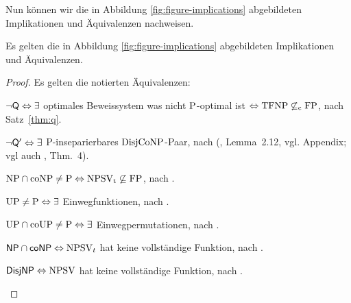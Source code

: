 Nun können wir die in Abbildung \ref{fig:figure-implications} abgebildeten Implikationen und Äquivalenzen nachweisen.
\begin{theorem}\label{thm:figure-implications}
    Es gelten die in Abbildung \ref{fig:figure-implications} abgebildeten Implikationen und Äquivalenzen.
\end{theorem}
\begin{proof}
    Es gelten die notierten Äquivalenzen:
    \begin{Prooflist}[noitemsep, midpenalty=0,label={\arabic*.},labelsep=3pt]
    \item $\neg\hQ \Leftrightarrow \exists$ optimales Beweissystem was nicht $\P$-optimal ist $\Leftrightarrow \TFNP\not\subseteq_\mathrm{c} \FP$, nach Satz~\ref{thm:q}.
    \item $\neg\hQ' \Leftrightarrow\exists$ P-inseparierbares $\DisjCoNP$-Paar, nach \citeauthor{fortnow_separability_1993} (\citeyear{fortnow_separability_1993}, Lemma~2.12, vgl. Appendix; vgl auch \cite{fenner_inverting_2003}, Thm.~4).
    \item $\NP\cap\coNP\neq\P \Leftrightarrow \NPSVt\not\subseteq\FP$, nach \textcite[Prop.~1]{fenner_inverting_2003}.
    \item $\UP\neq\P \Leftrightarrow\exists$ Einwegfunktionen, nach \textcite[Thm.~10]{grollmann_complexity_1988}.
    \item $\UP\cap\coUP\neq\P \Leftrightarrow\exists$ Einwegpermutationen, nach \textcite{homan_one-way_2003}.
    \item $\hNPcoNP \Leftrightarrow \NPSV_t$ hat keine vollständige Funktion, nach \textcite[Prop.~3]{beyersdorff_nondeterministic_2009}.
    \item $\hDisjNP \Leftrightarrow \NPSV$ hat keine vollständige Funktion, nach \textcite[Thm.~9]{glaser_reductions_2005}.
    \end{Prooflist}


\end{proof}
